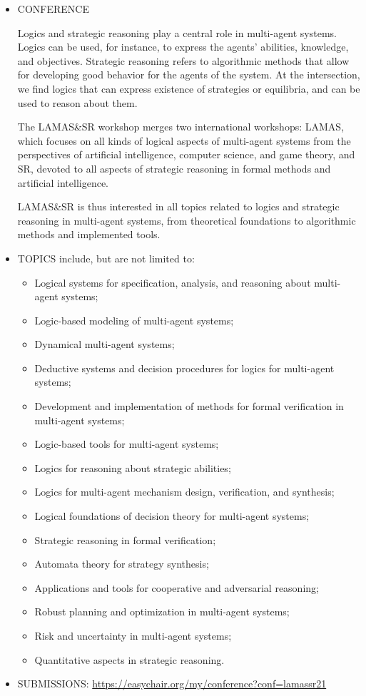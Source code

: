 \documentclass{article}
\begin{document}
\begin{itemize}\item  CONFERENCE 
 
  Logics and strategic reasoning play a central role in multi-agent systems. Logics can be used, for instance, to express the agents' abilities, knowledge, and objectives. Strategic reasoning refers to algorithmic methods that allow for developing good behavior for the agents of the system. At the intersection, we find logics that can express existence of strategies or equilibria, and can be used to reason about them.  
 
  The LAMAS\&SR workshop merges two international workshops: LAMAS, which focuses on all kinds of logical aspects of multi-agent systems from the perspectives of artificial intelligence, computer science, and game theory, and SR, devoted to all aspects of strategic reasoning in formal methods and artificial intelligence. 
 
  LAMAS\&SR is thus interested in all topics related to logics and strategic reasoning in multi-agent systems, from theoretical foundations to algorithmic methods and implemented tools. 
 
\item  TOPICS include, but are not limited to: 
 
\begin{itemize}\item  Logical systems for specification, analysis, and reasoning about multi-agent systems;
\item  Logic-based modeling of multi-agent systems;
\item  Dynamical multi-agent systems;
\item  Deductive systems and decision procedures for logics for multi-agent systems;
\item  Development and implementation of methods for formal verification in multi-agent systems;
\item  Logic-based tools for multi-agent systems;
\item  Logics for reasoning about strategic abilities;
\item  Logics for multi-agent mechanism design, verification, and synthesis;
\item  Logical foundations of decision theory for multi-agent systems;
\item  Strategic reasoning in formal verification;
\item  Automata theory for strategy synthesis;
\item  Applications and tools for cooperative and adversarial reasoning;
\item  Robust planning and optimization in multi-agent systems;
\item  Risk and uncertainty in multi-agent systems;
\item  Quantitative aspects in strategic reasoning.
\end{itemize} 
\item  SUBMISSIONS: \href{https://easychair.org/my/conference?conf=lamassr21}{https://easychair.org/my/conference?conf=lamassr21} 
 

\end{itemize}
\end{document}
